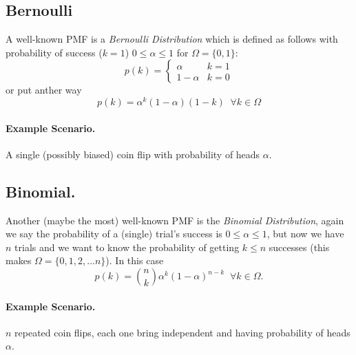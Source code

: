 \subsection{Bernoulli} 
A well-known PMF is a \emph{Bernoulli Distribution} which is defined as follows
with probability of success ($k=1$) $0 \le \alpha \le 1$ for $\Omega = \{0,1\}$: 
\[p(k) = \begin{cases}\alpha & k=1\\1-\alpha & k=0\end{cases}\]
or put anther way
\[p(k) = \alpha^k(1-\alpha)(1-k) \;\; \forall k\in\Omega\]

\paragraph{Example Scenario.} A single (possibly biased) coin flip with probability of heads $\alpha$.

\subsection{Binomial.}
Another (maybe the most) well-known PMF is the \emph{Binomial Distribution}, 
again we say the probability of a (single) trial's success is $0 \le \alpha \le 1$, 
but now we have $n$ trials and we want to know the probability of getting $k\le n$ successes 
(this makes $\Omega = \{0,1,2,...n\}$).
In this case 
\[p(k) = \binom n k \alpha^k (1-\alpha)^{n-k} \;\; \forall k\in\Omega.\]

\paragraph{Example Scenario.} $n$ repeated coin flips, each one bring independent and having probability of heads $\alpha$.

\begin{center}
\end{center}



